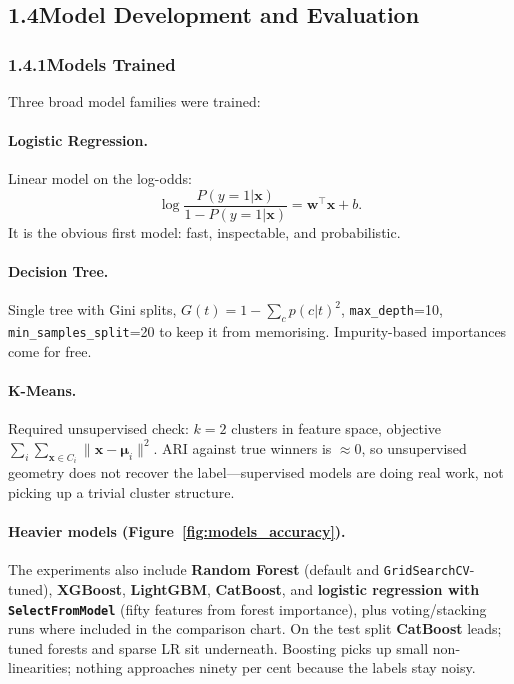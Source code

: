 \documentclass[12pt,a4paper]{article}
\newcommand{\GridSearchCVname}{\texttt{Grid\allowbreak Search\allowbreak CV}}
\begin{document}
\subsection{1.4\quad Model Development and Evaluation}

\subsubsection{1.4.1\quad Models Trained}

Three broad model families were trained:

\paragraph{Logistic Regression.} Linear model on the log-odds:
\[
\log\frac{P(y=1|\mathbf{x})}{1-P(y=1|\mathbf{x})}
=
\mathbf{w}^\top \mathbf{x} + b.
\]
It is the obvious first model: fast, inspectable, and probabilistic.

\paragraph{Decision Tree.} Single tree with Gini splits, $G(t) = 1 - \sum_c p(c|t)^2$, \texttt{max\_depth}=10, \texttt{min\_samples\_split}=20 to keep it from memorising. Impurity-based importances come for free.

\paragraph{K-Means.} Required unsupervised check: $k=2$ clusters in feature space, objective $\sum_i \sum_{\mathbf{x} \in C_i} \|\mathbf{x} - \boldsymbol{\mu}_i\|^2$. ARI against true winners is $\approx 0$, so unsupervised geometry does not recover the label---supervised models are doing real work, not picking up a trivial cluster structure.

\paragraph{Heavier models (Figure~\ref{fig:models_accuracy}).}
The experiments also include \textbf{Random Forest} (default and \GridSearchCVname{}-tuned), \textbf{XGBoost}, \textbf{LightGBM}, \textbf{CatBoost}, and \textbf{logistic regression with \texttt{SelectFromModel}} (fifty features from forest importance), plus voting/stacking runs where included in the comparison chart. On the test split \textbf{CatBoost} leads; tuned forests and sparse LR sit underneath. Boosting picks up small non-linearities; nothing approaches ninety per cent because the labels stay noisy.
\end{document}
